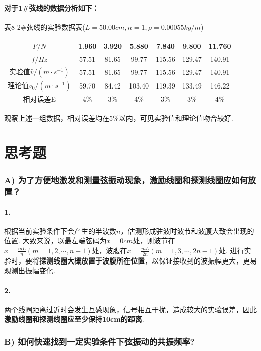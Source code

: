 \documentclass[UTF8]{ctexart}
\begin{document}
\paragraph{对于1\#弦线的数据分析如下：}
\begin{center}
{\kaishu 表8 2\#弦线的实验数据表($L=50.00cm, n=1, \rho=0.00055kg/m$)}
\begin{tabular}{|c|c|c|c|c|c|c|}
\hline
	$F/N$&1.960&3.920&5.880&7.840&9.800&11.760\\
\hline
	$f/Hz$&57.51&81.65&99.77&115.56&129.47&140.91\\
\hline
	实验值$\hat{v}/(m\cdot s^{-1})$&57.51&81.65&99.77&115.56&129.47&140.91\\
\hline
	理论值${v_0}/(m\cdot s^{-1})$&59.70&84.42&103.40&119.39&133.49&146.22\\
\hline
	相对误差E&4\%&3\%&4\%&3\%&3\%&4\%\\
\hline
\end{tabular}\end{center}\par
观察上述一组数据，相对误差均在5\%以内，可见实验值和理论值吻合较好.

\section{思考题}
\subsubsection*{A) 为了方便地激发和测量弦振动现象，激励线圈和探测线圈应如何放置？}
\paragraph{1.}根据当前实验条件下会产生的半波数$n$，估测形成驻波时波节和波腹大致会出现的位置. 大致来说，以最左端弦码为$x=0cm$处，则波节在$x=\frac{mL}{n}(m=1,2,\cdots,n-1)$处，波腹在$x=\frac{mL}{2n}(m=1,3,\cdots,2n-1)$处. 进行实验时，要将\textbf{探测线圈大概放置于波腹所在位置}，以保证接收到的波振幅更大，更易观测出振幅变化.
\paragraph{2.}两个线圈距离过近时会发生互感现象，信号相互干扰，造成较大的实验误差，因此\textbf{激励线圈和探测线圈应至少保持10cm的距离}.

\subsubsection*{B) 如何快速找到一定实验条件下弦振动的共振频率?}
\end{document}
